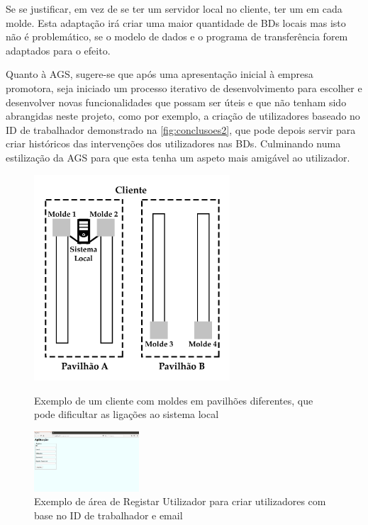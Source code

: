 \documentclass[11pt,twoside,a4paper]{report}
\begin{document}
Se se justificar, em vez de se ter um servidor local no cliente, ter um em cada molde. Esta adaptação irá criar uma maior quantidade de BDs locais mas isto não é problemático, se o modelo de dados e o programa de transferência forem adaptados para o efeito.\par
Quanto à AGS, sugere-se que após uma apresentação inicial à empresa promotora, seja iniciado um processo iterativo de desenvolvimento para escolher e desenvolver novas funcionalidades que possam ser úteis e que não tenham sido abrangidas neste projeto, como por exemplo, a criação de utilizadores baseado no ID de trabalhador demonstrado na \autoref{fig:conclusoes2}, que pode depois servir para criar históricos das intervenções dos utilizadores nas BDs. Culminando numa estilização da AGS para que esta tenha um aspeto mais amigável ao utilizador.\par
\begin{figure}
	\centering
	\begin{minipage}{1\textwidth}
		\begin{center}
			\includegraphics[width=0.65\textwidth]{exemplo_pavilhoes} %
			\caption[Exemplo de um cliente com moldes em pavilhões diferentes]{Exemplo de um cliente com moldes em pavilhões diferentes, que pode dificultar as ligações ao sistema local}
			\label{fig:conclusoes3}
		\end{center}
	\end{minipage}
	\begin{minipage}{1\textwidth}
		\begin{center}
			\includegraphics[trim={0 9cm 35cm 0},clip,width=0.35\textwidth]{futuro02} %
			\caption[Exemplo de área de Registar Utilizador]{Exemplo de área de Registar Utilizador para criar utilizadores com base no ID de trabalhador e email}
			\label{fig:conclusoes2}
		\end{center}
	\end{minipage}
\end{figure}
\end{document}
